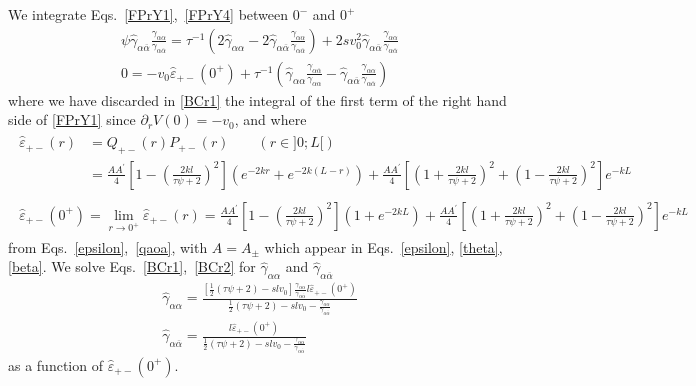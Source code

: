 \documentclass[pre,aps,superscriptaddress,nofootinbib]{revtex4}
\begin{document}
We integrate Eqs.~\ref{FPrY1},~\ref{FPrY4} between $0^-$ and $0^+$
\begin{eqnarray}
\label{BCr1}
\psi \hat{\gamma}_{\alpha\overline{\alpha}} \frac{\gamma_{\alpha\alpha}}{\gamma_{\alpha\overline{\alpha}}} = \tau^{-1} \left(2 \hat{\gamma}_{\alpha\alpha} - 2 \hat{\gamma}_{\alpha\overline{\alpha}} \frac{\gamma_{\alpha\alpha}}{\gamma_{\alpha\overline{\alpha}}}\right) + 2 s v_0^2 \hat{\gamma}_{\alpha\overline{\alpha}} \frac{\gamma_{\alpha\alpha}}{\gamma_{\alpha\overline{\alpha}}}\\
\label{BCr2}
0 = - v_0 \hat{\varepsilon}_{+-}(0^+) + \tau^{-1} \left(\hat{\gamma}_{\alpha\alpha} \frac{\gamma_{\alpha\overline{\alpha}}}{\gamma_{\alpha\alpha}} - \hat{\gamma}_{\alpha\overline{\alpha}} \frac{\gamma_{\alpha\alpha}}{\gamma_{\alpha\overline{\alpha}}}\right)
\end{eqnarray}
where we have discarded in \eqref{BCr1} the integral of the first term of the right hand side of \eqref{FPrY1} since $\partial_r V(0) = -v_0$, and where
\begin{eqnarray}
\label{he+-}
\begin{aligned}
\hat{\varepsilon}_{+-}(r) &= Q_{+-}(r) P_{+-}(r) \qquad (r \in ]0; L[)\\
&= \frac{A A^{\prime}}{4} \left[1 - \left(\frac{2 k l}{\tau \psi + 2}\right)^2\right](e^{-2 k r} + e^{-2 k (L - r)}) + \frac{A A^{\prime}}{4} \left[\left(1 + \frac{2 k l}{\tau \psi + 2}\right)^2 + \left(1 - \frac{2 k l}{\tau \psi + 2}\right)^2\right] e^{-k L}
\end{aligned}\\
\label{he+-lim}
\begin{aligned}
\hat{\varepsilon}_{+-}(0^+) = \lim_{r \to 0^+} \hat{\varepsilon}_{+-}(r) = \frac{A A^{\prime}}{4} \left[1 - \left(\frac{2 k l}{\tau \psi + 2}\right)^2\right](1 + e^{-2 k L}) + \frac{A A^{\prime}}{4} \left[\left(1 + \frac{2 k l}{\tau \psi + 2}\right)^2 + \left(1 - \frac{2 k l}{\tau \psi + 2}\right)^2\right] e^{-k L}
\end{aligned}
\end{eqnarray}
from Eqs.~\ref{epsilon},~\ref{qaoa}, with $A = A_{\pm}$ which appear in Eqs.~\ref{epsilon}, \ref{theta}, \ref{beta}. We solve Eqs.~\ref{BCr1},~\ref{BCr2} for $\hat{\gamma}_{\alpha\alpha}$ and $\hat{\gamma}_{\alpha\overline{\alpha}}$
\begin{eqnarray}
\label{hgaa}
\hat{\gamma}_{\alpha\alpha} = \frac{\left[\frac{1}{2} (\tau \psi + 2) - s l v_0\right] \frac{\gamma_{\alpha\alpha}}{\gamma_{\alpha\overline{\alpha}}} l \hat{\varepsilon}_{+-}(0^+)}{\frac{1}{2}(\tau\psi + 2) - s l v_0 - \frac{\gamma_{\alpha\alpha}}{\gamma_{\alpha\overline{\alpha}}}}\\
\label{hgaoa}
\hat{\gamma}_{\alpha\overline{\alpha}} = \frac{l \hat{\varepsilon}_{+-}(0^+)}{\frac{1}{2}(\tau\psi + 2) - s l v_0 - \frac{\gamma_{\alpha\alpha}}{\gamma_{\alpha\overline{\alpha}}}}
\end{eqnarray}
as a function of $\hat{\varepsilon}_{+-}(0^+)$.\\
\end{document}
